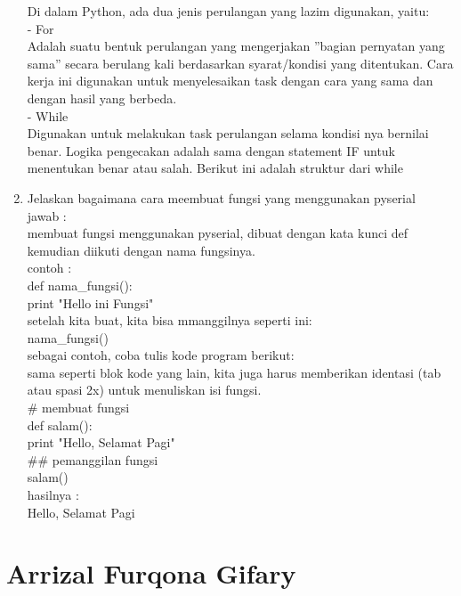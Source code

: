 \begin{enumerate}
Di dalam Python, ada dua jenis perulangan yang lazim digunakan, yaitu:\\

- For\\
Adalah suatu bentuk perulangan yang mengerjakan ”bagian pernyatan yang sama” secara berulang kali berdasarkan syarat/kondisi yang ditentukan. Cara kerja ini digunakan untuk menyelesaikan task dengan cara yang sama dan dengan hasil yang berbeda.\\

- While\\
Digunakan  untuk melakukan task perulangan selama kondisi nya bernilai benar. Logika pengecakan adalah sama dengan statement IF untuk menentukan benar atau salah. Berikut ini adalah struktur dari while\\

\item Jelaskan bagaimana cara meembuat fungsi yang menggunakan pyserial\\
jawab :\\
membuat fungsi menggunakan pyserial, dibuat dengan kata kunci def kemudian diikuti dengan nama fungsinya.\\
contoh :\\
def nama\_fungsi():\\
	print "Hello ini Fungsi"\\

setelah kita buat, kita bisa mmanggilnya seperti ini:\\
nama\_fungsi()\\
sebagai contoh, coba tulis kode program berikut:\\
sama seperti blok kode yang lain, kita juga harus memberikan identasi (tab atau spasi 2x) untuk menuliskan isi fungsi.\\

\# membuat fungsi\\
def salam():\\
	print "Hello, Selamat Pagi"\\
\#\# pemanggilan fungsi\\
salam()\\
hasilnya : \\
Hello, Selamat Pagi\\

\end{enumerate}
\section{Arrizal Furqona Gifary}
